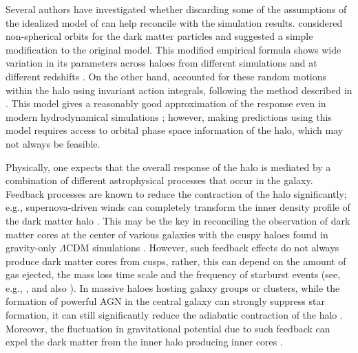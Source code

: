 Several authors have investigated whether discarding some of the assumptions of the idealized model of \citet[][]{1986ApJ...301...27B} can help reconcile with the simulation results. \citet{2004ApJ...616...16G} considered non-spherical orbits for the dark matter particles and suggested a simple modification to the original model. This modified empirical formula shows wide variation in its parameters across haloes from different simulations and at different redshifts \citep[][]{2006PhRvD..74l3522G,2010MNRAS.405.2161D}. On the other hand, \citet[][]{2005ApJ...634...70S} accounted for these random motions within the halo using invariant action integrals, following the method described in \citet{1980ApJ...242.1232Y}. This model gives a reasonably good approximation of the response even in modern hydrodynamical simulations \citep{2020MNRAS.495...12C}; 
however, making predictions using this model requires access to orbital phase space information of the halo, which may not always be feasible.

Physically, one expects that the overall response of the halo is mediated by a combination of different astrophysical processes that occur in the galaxy. Feedback processes are known to reduce the contraction of the halo significantly; e.g.,
supernova-driven winds can completely transform the inner density profile of the dark matter halo
\citep[][]{1996MNRAS.283L..72N}. This may be the key in reconciling the observation of dark matter cores at the center of various galaxies with the cuspy haloes found in gravity-only $\Lambda$CDM simulations \citep[see][for a review]{2014Natur.506..171P}.
However, such feedback effects do not always produce dark matter cores from cusps, rather, this can depend on the amount of gas ejected, the mass loss time scale and the frequency of starburst events 
(see, e.g., \citealp{2011ApJ...736L...2O,2014ApJ...793...46O,2012MNRAS.421.3464P}, and also \citealp{bfln18}).
In massive haloes hosting galaxy groups or clusters, while the formation of powerful AGN in the central galaxy can strongly suppress star formation,
it can still significantly reduce the adiabatic contraction of the halo \citep[][]{2011MNRAS.414..195T}.
Moreover, the fluctuation in gravitational potential due to such feedback can expel the dark matter from the inner halo producing inner cores \citep[][]{2012MNRAS.422.3081M}.

